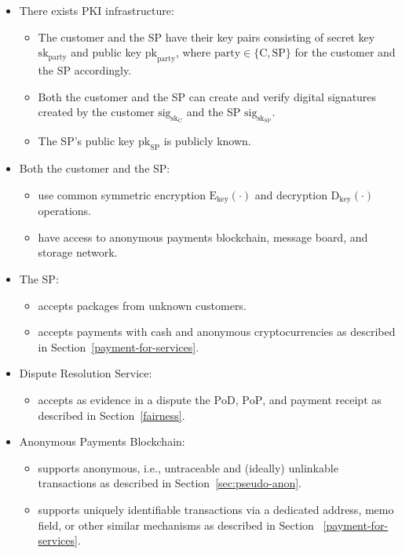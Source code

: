 \documentclass[pdftex,twocolumn,epjc3]{svjour3}
\begin{document}
{\begin{itemize}
\item There exists PKI infrastructure:
    \begin{itemize}
        \item The customer and the SP have their key pairs consisting of secret key $\mathrm{sk}_\mathrm{party}$ and public key $\mathrm{pk}_\mathrm{party}$, where $\mathrm{party} \in \{\mathrm{C}, \mathrm{SP}\}$ for the customer and the SP accordingly.
        \item Both the customer and the SP can create and verify digital signatures created by the customer $\mathrm{sig}_{\mathrm{sk}_\mathrm{C}}$ and the SP $\mathrm{sig}_{\mathrm{sk}_\mathrm{SP}}$.
        \item The SP's public key $\mathrm{pk}_\mathrm{SP}$ is publicly known.
    \end{itemize}
    
\item Both the customer and the SP:
    \begin{itemize}
        \item use common symmetric encryption $\mathrm{E}_\mathrm{key}(\cdot)$ and decryption $\mathrm{D}_\mathrm{key}(\cdot)$ operations.
        \item have access to anonymous payments blockchain, message board, and storage network.
    \end{itemize}

\item The SP:
    \begin{itemize}
        \item accepts packages from unknown customers.
        \item accepts payments with cash and anonymous cryptocurrencies as described in Section~\ref{payment-for-services}.
    \end{itemize}
    
\item Dispute Resolution Service:
    \begin{itemize}
        \item accepts as evidence in a dispute the $\mathrm{PoD}$, $\mathrm{PoP}$, and payment $\mathrm{receipt}$ as described in Section~\ref{fairness}.
    \end{itemize}

\item Anonymous Payments Blockchain:
    \begin{itemize}
        \item supports anonymous, i.e., untraceable and (ideally) unlinkable transactions as described in Section~\ref{sec:pseudo-anon}.
        \item supports uniquely identifiable transactions via a dedicated address, memo field, or other similar mechanisms as described in Section ~\ref{payment-for-services}. 
    \end{itemize}


\end{itemize}}
\end{document}
